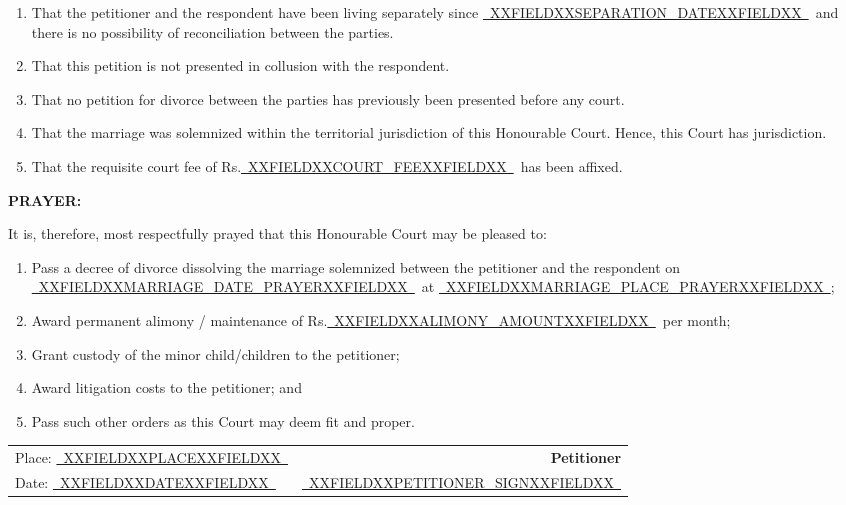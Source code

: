 \documentclass[12pt,a4paper]{article}
\newcommand{\fillline}[1]{\underline{~#1~}}
\begin{document}
\begin{enumerate}[leftmargin=*, label=\arabic{enumi}., itemsep=10pt, topsep=2pt]
  \item That the petitioner and the respondent have been living separately
        since \fillline{XXFIELDXXSEPARATION_DATEXXFIELDXX}\ and there is no possibility of
        reconciliation between the parties.

  \item That this petition is not presented in collusion with the respondent.

  \item That no petition for divorce between the parties has previously been
        presented before any court.

  \item That the marriage was solemnized within the territorial jurisdiction
        of this Honourable Court. Hence, this Court has jurisdiction.

  \item That the requisite court fee of Rs.\fillline{XXFIELDXXCOURT_FEEXXFIELDXX}\ has been affixed.

\end{enumerate}

\vspace{14pt}

\textbf{PRAYER:}

It is, therefore, most respectfully prayed that this Honourable Court may be pleased to:

\begin{enumerate}[leftmargin=*, label=(\alph*), itemsep=6pt, topsep=4pt]
  \item Pass a decree of divorce dissolving the marriage solemnized between
        the petitioner and the respondent on \fillline{XXFIELDXXMARRIAGE_DATE_PRAYERXXFIELDXX}\ at
        \fillline{XXFIELDXXMARRIAGE_PLACE_PRAYERXXFIELDXX};
  \item Award permanent alimony / maintenance of Rs.\fillline{XXFIELDXXALIMONY_AMOUNTXXFIELDXX}\ per month;
  \item Grant custody of the minor child/children to the petitioner;
  \item Award litigation costs to the petitioner; and
  \item Pass such other orders as this Court may deem fit and proper.
\end{enumerate}

\vspace{20pt}

\noindent
\begin{tabularx}{\textwidth}{@{}X r@{}}
  Place: \fillline{XXFIELDXXPLACEXXFIELDXX} & \textbf{Petitioner} \\[10pt]
  Date: \fillline{XXFIELDXXDATEXXFIELDXX}  & \fillline{XXFIELDXXPETITIONER_SIGNXXFIELDXX} \\
\end{tabularx}
\end{document}
